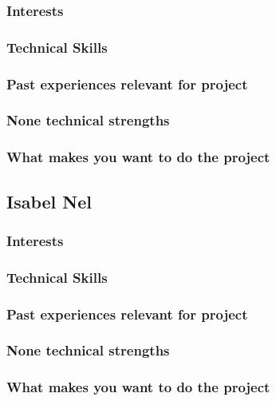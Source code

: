 \documentclass[hidelinks, 12pt, oneside]{article}
\begin{document}
\subsubsection{Interests}
\subsubsection{Technical Skills}
\subsubsection{Past experiences relevant for project}
\subsubsection{None technical strengths}
\subsubsection{What makes you want to do the project}

\subsection{Isabel Nel}
\subsubsection{Interests}
\subsubsection{Technical Skills}
\subsubsection{Past experiences relevant for project}
\subsubsection{None technical strengths}
\subsubsection{What makes you want to do the project}
\end{document}
